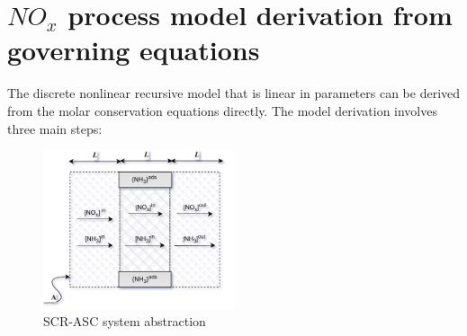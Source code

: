 \newpage
\section{$NO_x$ process model derivation from governing equations}
The discrete nonlinear recursive model that is linear in parameters can be derived from the molar conservation equations directly. The model derivation involves three main steps:
\begin{figure}[H]
        \centering
        \includegraphics[width = 0.5\textwidth]{./figs/scr_sys/plug_flow_discrete.png}
        \caption{SCR-ASC system abstraction}
\end{figure}
